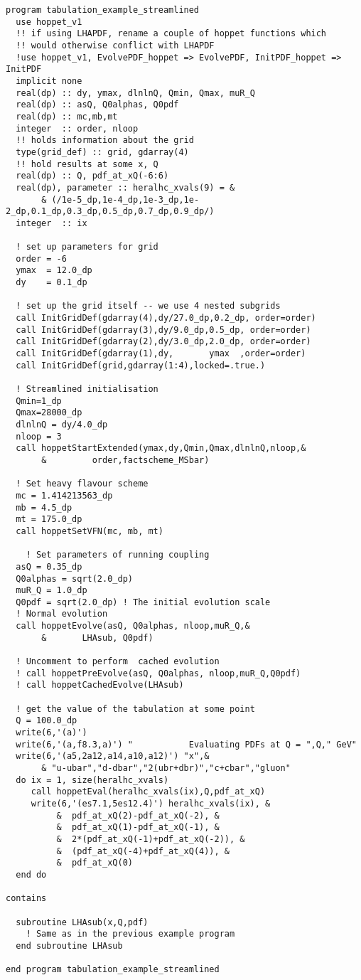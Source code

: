 \documentclass[12pt]{article}
\begin{document}
\begin{lstlisting}
program tabulation_example_streamlined
  use hoppet_v1
  !! if using LHAPDF, rename a couple of hoppet functions which
  !! would otherwise conflict with LHAPDF 
  !use hoppet_v1, EvolvePDF_hoppet => EvolvePDF, InitPDF_hoppet => InitPDF
  implicit none
  real(dp) :: dy, ymax, dlnlnQ, Qmin, Qmax, muR_Q
  real(dp) :: asQ, Q0alphas, Q0pdf
  real(dp) :: mc,mb,mt
  integer  :: order, nloop
  !! holds information about the grid
  type(grid_def) :: grid, gdarray(4)
  !! hold results at some x, Q
  real(dp) :: Q, pdf_at_xQ(-6:6)
  real(dp), parameter :: heralhc_xvals(9) = &
       & (/1e-5_dp,1e-4_dp,1e-3_dp,1e-2_dp,0.1_dp,0.3_dp,0.5_dp,0.7_dp,0.9_dp/)
  integer  :: ix

  ! set up parameters for grid
  order = -6
  ymax  = 12.0_dp
  dy    = 0.1_dp

  ! set up the grid itself -- we use 4 nested subgrids
  call InitGridDef(gdarray(4),dy/27.0_dp,0.2_dp, order=order)
  call InitGridDef(gdarray(3),dy/9.0_dp,0.5_dp, order=order)
  call InitGridDef(gdarray(2),dy/3.0_dp,2.0_dp, order=order)
  call InitGridDef(gdarray(1),dy,       ymax  ,order=order)
  call InitGridDef(grid,gdarray(1:4),locked=.true.)

  ! Streamlined initialisation
  Qmin=1_dp
  Qmax=28000_dp
  dlnlnQ = dy/4.0_dp
  nloop = 3
  call hoppetStartExtended(ymax,dy,Qmin,Qmax,dlnlnQ,nloop,&
       &         order,factscheme_MSbar)
    
  ! Set heavy flavour scheme
  mc = 1.414213563_dp
  mb = 4.5_dp
  mt = 175.0_dp
  call hoppetSetVFN(mc, mb, mt)
  
    ! Set parameters of running coupling
  asQ = 0.35_dp
  Q0alphas = sqrt(2.0_dp)
  muR_Q = 1.0_dp
  Q0pdf = sqrt(2.0_dp) ! The initial evolution scale
  ! Normal evolution
  call hoppetEvolve(asQ, Q0alphas, nloop,muR_Q,&
       &       LHAsub, Q0pdf)

  ! Uncomment to perform  cached evolution
  ! call hoppetPreEvolve(asQ, Q0alphas, nloop,muR_Q,Q0pdf) 
  ! call hoppetCachedEvolve(LHAsub)
    
  ! get the value of the tabulation at some point
  Q = 100.0_dp
  write(6,'(a)')
  write(6,'(a,f8.3,a)') "           Evaluating PDFs at Q = ",Q," GeV"
  write(6,'(a5,2a12,a14,a10,a12)') "x",&
       & "u-ubar","d-dbar","2(ubr+dbr)","c+cbar","gluon"
  do ix = 1, size(heralhc_xvals)
     call hoppetEval(heralhc_xvals(ix),Q,pdf_at_xQ)
     write(6,'(es7.1,5es12.4)') heralhc_xvals(ix), &
          &  pdf_at_xQ(2)-pdf_at_xQ(-2), &
          &  pdf_at_xQ(1)-pdf_at_xQ(-1), &
          &  2*(pdf_at_xQ(-1)+pdf_at_xQ(-2)), &
          &  (pdf_at_xQ(-4)+pdf_at_xQ(4)), &
          &  pdf_at_xQ(0)
  end do
  
contains 
 
  subroutine LHAsub(x,Q,pdf)
    ! Same as in the previous example program
  end subroutine LHAsub

end program tabulation_example_streamlined
\end{lstlisting}
\end{document}
